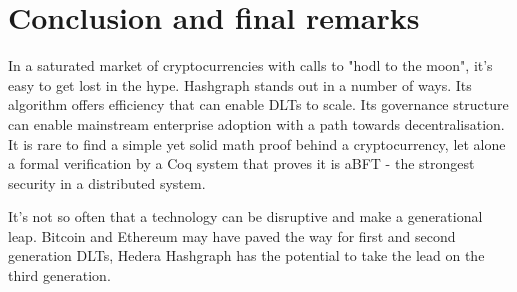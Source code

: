\section{Conclusion and final remarks}

In a saturated market of cryptocurrencies with calls to "hodl to the moon", it's easy to get lost in the hype. Hashgraph stands out in a number of ways. Its algorithm offers efficiency that can enable DLTs to scale. Its governance structure can enable mainstream enterprise adoption with a path towards decentralisation. It is rare to find a simple yet solid math proof behind a cryptocurrency, let alone a formal verification by a Coq system that proves it is aBFT - the strongest security in a distributed system.

It's not so often that a technology can be disruptive and make a generational leap. Bitcoin and Ethereum may have paved the way for first and second generation DLTs, Hedera Hashgraph has the potential to take the lead on the third generation.
